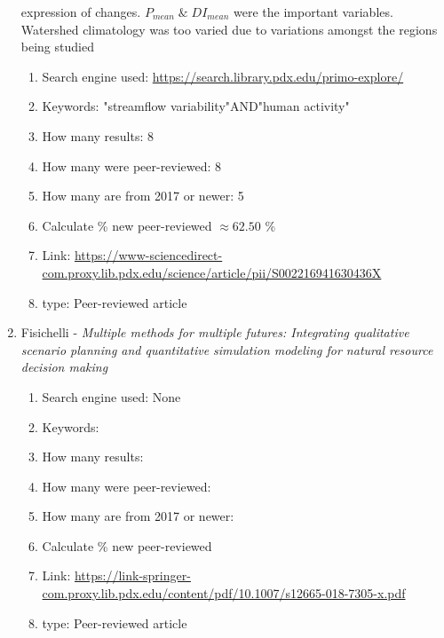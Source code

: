 \documentclass{article}
\begin{document}
\begin{enumerate}
expression of changes. $P_\textit{mean} \;\&\; DI_\textit{mean}$ were the important variables. Watershed climatology was too varied due to variations amongst the regions being studied 

        \begin{enumerate}
            \item Search engine used: \url{https://search.library.pdx.edu/primo-explore/}
            \item Keywords: "streamflow variability"AND"human activity"
            \item How many results: 8 
            \item How many were peer-reviewed: 8
            \item How many are from 2017 or newer: 5
            \item Calculate \% new peer-reviewed $\approx 62.50$  \%
            \item Link: \url{https://www-sciencedirect-com.proxy.lib.pdx.edu/science/article/pii/S002216941630436X}
            \item type: Peer-reviewed article
        \end{enumerate}

    \item Fisichelli - \textit{Multiple methods for multiple futures: Integrating qualitative scenario planning and quantitative simulation modeling for natural resource decision making}
        \begin{enumerate}
            \item Search engine used: None 
            \item Keywords: 
            \item How many results:  
            \item How many were peer-reviewed: 
            \item How many are from 2017 or newer: 
            \item Calculate \% new peer-reviewed 
            \item Link: \url{https://link-springer-com.proxy.lib.pdx.edu/content/pdf/10.1007/s12665-018-7305-x.pdf}
            \item type: Peer-reviewed article
        \end{enumerate}


\end{enumerate}
\end{document}
